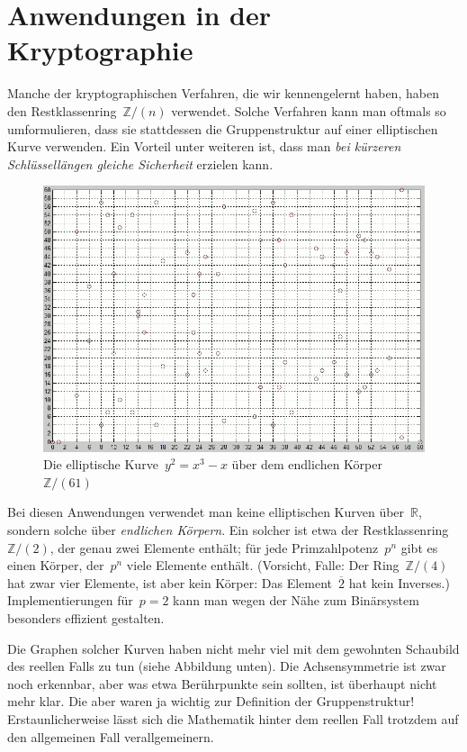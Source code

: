 \documentclass{../zirkelblatt}
\newcommand{\head}[1]{\section*{\rmfamily #1}}%
\newcommand{\ol}[1]{\ensuremath{\overline{#1}}}
\newcommand{\ZZ}{\mathbb{Z}}
\newcommand{\RR}{\mathbb{R}}
\begin{document}
\head{Anwendungen in der Kryptographie}

Manche der kryptographischen Verfahren, die wir kennengelernt haben, haben den
Restklassenring~$\ZZ/(n)$ verwendet. Solche Verfahren kann man oftmals so
umformulieren, dass sie stattdessen die Gruppenstruktur auf einer elliptischen
Kurve verwenden. Ein Vorteil unter weiteren ist, dass man \emph{bei kürzeren
Schlüssellängen gleiche Sicherheit} erzielen kann.

\begin{figure}[b!]
  \centering
  \includegraphics[scale=0.4]{elliptic-curve-z61}
  \caption{Die elliptische Kurve~$y^2 = x^3 - x$ über dem endlichen
  Körper~$\ZZ/(61)$}
\end{figure}

Bei diesen Anwendungen verwendet man keine elliptischen Kurven über~$\RR$,
sondern solche über \emph{endlichen Körpern}. Ein solcher ist etwa der
Restklassenring~$\ZZ/(2)$, der genau zwei Elemente enthält; für jede
Primzahlpotenz~$p^n$ gibt es einen Körper, der~$p^n$ viele
Elemente enthält. (Vorsicht, Falle: Der Ring~$\ZZ/(4)$ hat zwar vier
Elemente, ist aber kein Körper: Das Element~$\ol{2}$ hat kein Inverses.)
Implementierungen für~$p = 2$ kann man wegen der Nähe zum Binärsystem besonders
effizient gestalten.

Die Graphen solcher Kurven haben nicht mehr viel mit dem
gewohnten Schaubild des reellen Falls zu tun (siehe Abbildung unten). Die
Achsensymmetrie ist zwar noch erkennbar, aber was etwa Berührpunkte sein
sollten, ist überhaupt nicht mehr klar. Die aber waren ja wichtig zur
Definition der Gruppenstruktur! Erstaunlicherweise lässt sich die Mathematik
hinter dem reellen Fall trotzdem auf den allgemeinen Fall verallgemeinern.
\end{document}
